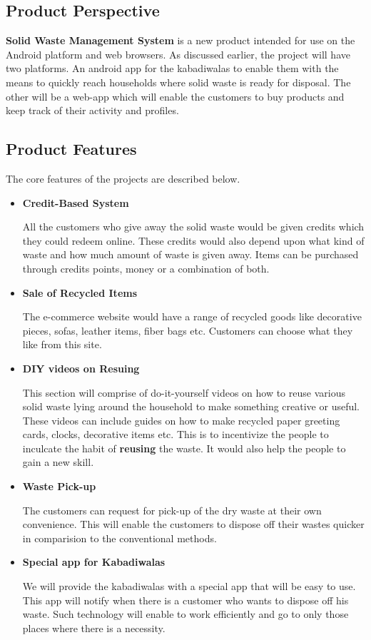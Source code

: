 \documentclass{article}
\begin{document}
\subsection{Product Perspective}
\par \textbf{Solid Waste Management System} is a new product intended for use on the Android platform and web browsers. As discussed earlier, the project will have two platforms. An android app for the kabadiwalas to enable them with the means to quickly reach households where solid waste is ready for disposal. The other will be a web-app which will enable the customers to buy products and keep track of their activity and profiles.
\subsection{Product Features}
\par The core features of the projects are described below. 
\begin{itemize}
    \item \textbf{Credit-Based System}
    \par All the customers who give away the solid waste would be given credits which they could redeem online.
    These credits would also depend upon what kind of waste and how much amount of waste is given away. Items can be purchased through credits points, money or a combination of both.
    \item \textbf{Sale of Recycled Items}
    \par The e-commerce website would have a range of recycled goods like decorative pieces, sofas, leather items, fiber bags etc. Customers can choose what they like from this site.
    
    \item \textbf{DIY videos on Resuing}
    \par This section will comprise of do-it-yourself videos on how to reuse various solid waste lying around the household to make something creative or useful. These videos can include guides on how to make recycled paper greeting cards, clocks, decorative items etc. This is to incentivize the people to inculcate the habit of \textbf{reusing} the waste. It would also help the people to gain a new skill.    
    \item \textbf{Waste Pick-up}
    \par The customers can request for pick-up of the dry waste at their own convenience. This will enable the customers to dispose off their wastes quicker in comparision to the conventional methods.
    
    \item \textbf{Special app for Kabadiwalas}
    \par We will provide the kabadiwalas with a special app that will be easy to use. This app will notify when there is a customer who wants to dispose off his waste. Such technology will enable to work efficiently and go to only those places where there is a necessity.
    
    
\end{itemize}
\end{document}
